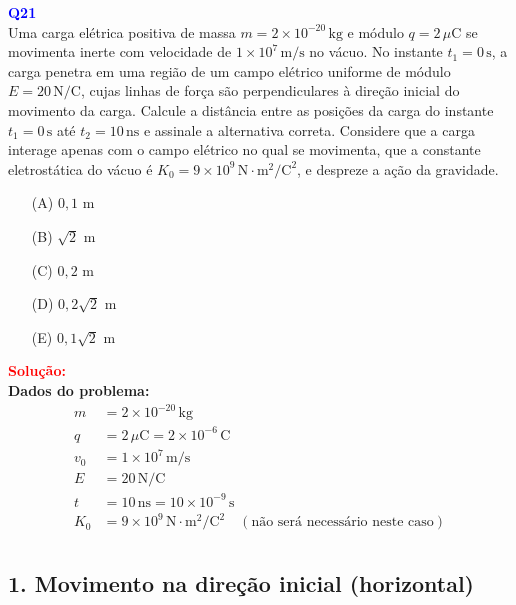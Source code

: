 \documentclass[a4paper,12pt]{article}
\begin{document}
\begin{flushleft}
\textbf{\textcolor{blue}{\Large Q21}}\\

Uma carga elétrica positiva de massa \( m = 2 \times 10^{-20} \, \text{kg} \) e módulo \( q = 2 \, \mu\text{C} \) se movimenta
inerte com velocidade de \( 1 \times 10^7 \, \text{m/s} \) no vácuo. No instante \( t_1 = 0 \, \text{s} \), a carga penetra 
em uma região de um campo elétrico uniforme de módulo \( E = 20 \, \text{N/C} \), cujas linhas de força são perpendiculares 
à direção inicial do movimento da carga. Calcule a distância entre as posições da carga do instante \( t_1 = 0 \, \text{s} \) 
até \( t_2 = 10 \, \text{ns} \) e assinale a alternativa correta. Considere que a carga interage apenas com o campo elétrico 
no qual se movimenta, que a constante eletrostática do vácuo é \( K_0 = 9 \times 10^9 \, \text{N}\cdot\text{m}^2/\text{C}^2 \), 
e despreze a ação da gravidade.

\begin{itemize}
\item[(A)] $0{,}1$ m
\item[(B)] $\sqrt{2}$ m  
\item[(C)] $0{,}2$ m
\item[(D)] $0{,}2\sqrt{2}$ m  
\item[(E)] $0{,}1\sqrt{2}$ m  
\end{itemize}

\vspace{0.5cm}

\textcolor{red}{\textbf{Solução:}}\\

\textbf{Dados do problema:}
\begin{align*}
m &= 2 \times 10^{-20} \, \text{kg} \\
q &= 2 \, \mu\text{C} = 2 \times 10^{-6} \, \text{C} \\
v_0 &= 1 \times 10^7 \, \text{m/s} \\
E &= 20 \, \text{N/C} \\
t &= 10 \, \text{ns} = 10 \times 10^{-9} \, \text{s} \\
K_0 &= 9 \times 10^9 \, \text{N} \cdot \text{m}^2/\text{C}^2 \quad (\text{não será necessário neste caso}) \\
\end{align*}

\subsection*{1. Movimento na direção inicial (horizontal)}


\end{flushleft}
\end{document}
